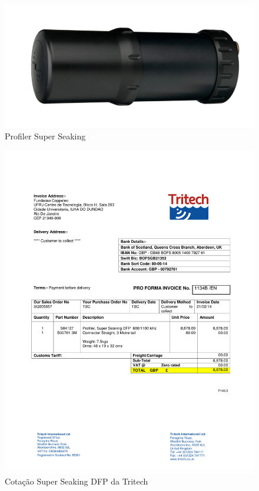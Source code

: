 \begin{figure}[h!]
 \centering
 \includegraphics[width=0.3\columnwidth]{Seaking_Profiler/foto.pdf}
 \caption{Profiler Super Seaking}
  
\end{figure}
\newpage

\begin{figure}[h!]
 \centering
 \includegraphics[width=1\columnwidth]{Seaking_profiler/price_quote_0.pdf}
 \caption{Cotação Super Seaking DFP da Tritech}
  
\end{figure}

